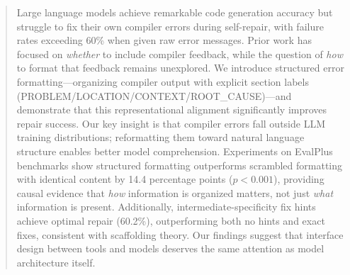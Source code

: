 \begin{abstract}
Large language models achieve remarkable code generation accuracy but struggle to fix their own compiler errors during self-repair, with failure rates exceeding 60\% when given raw error messages. Prior work has focused on \emph{whether} to include compiler feedback, while the question of \emph{how} to format that feedback remains unexplored. We introduce structured error formatting---organizing compiler output with explicit section labels (PROBLEM/LOCATION/CONTEXT/ROOT\_CAUSE)---and demonstrate that this representational alignment significantly improves repair success. Our key insight is that compiler errors fall outside LLM training distributions; reformatting them toward natural language structure enables better model comprehension. Experiments on EvalPlus benchmarks show structured formatting outperforms scrambled formatting with identical content by 14.4 percentage points ($p < 0.001$), providing causal evidence that \emph{how} information is organized matters, not just \emph{what} information is present. Additionally, intermediate-specificity fix hints achieve optimal repair (60.2\%), outperforming both no hints and exact fixes, consistent with scaffolding theory. Our findings suggest that interface design between tools and models deserves the same attention as model architecture itself.
\end{abstract}
